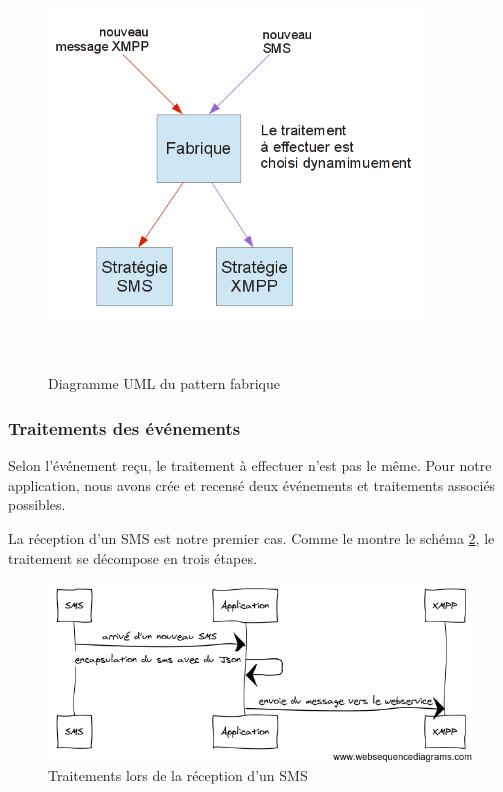 \begin{figure}[H]
  \center
  \includegraphics[width=10cm]{img/fonctionnement-strategie-factorie.png}
  \caption{Diagramme UML du pattern fabrique}
  \label{fonctionnement-strategie-factorie}
~~\\
\end{figure}
 
 
\subsubsection{Traitements des événements}
 
Selon l'événement reçu, le traitement à effectuer n'est pas le même. Pour notre application, nous avons 
crée et recensé deux événements et traitements associés possibles.
 
La réception d'un SMS est notre premier cas. Comme le montre le schéma \ref{encapsulation-sms}, le traitement se 
décompose en trois étapes. 
 
\begin{figure}[!h]
  \center
  \includegraphics[width=12cm]{img/encapsulation-sms.png}
  \caption{Traitements lors de la réception d'un SMS}
  \label{encapsulation-sms}
\end{figure}
 
